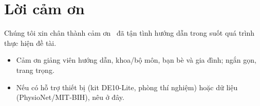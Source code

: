 \chapter*{Lời cảm ơn}

Chúng tôi xin chân thành cảm ơn \dsgvhd\ đã tận tình hướng dẫn trong suốt quá trình thực hiện đề tài.

\begin{goiy}
  \begin{itemize}
    \item Cảm ơn giảng viên hướng dẫn, khoa/bộ môn, bạn bè và gia đình; ngắn gọn, trang trọng.
    \item Nếu có hỗ trợ thiết bị (kit DE10-Lite, phòng thí nghiệm) hoặc dữ liệu (PhysioNet/MIT-BIH), nêu ở đây.
  \end{itemize}
\end{goiy}
